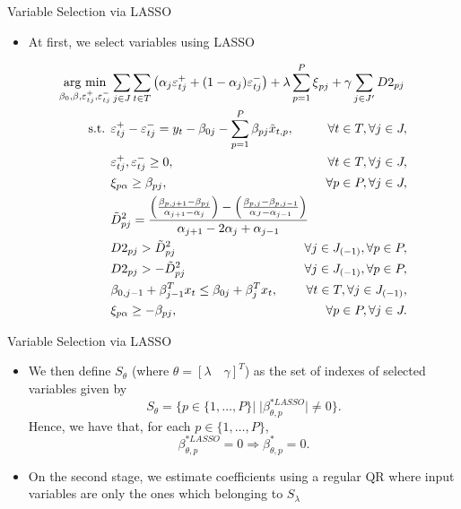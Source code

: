 \begin{frame}{Variable Selection via LASSO}

\begin{itemize}
\tightlist
\item
  At first, we select variables using LASSO
\end{itemize}

\tiny

\begin{eqnarray}
\underset{\beta_{0},\beta,\varepsilon_{t j}^{+},\varepsilon_{t j}^{-}}{\text{arg min}} & \sum_{j \in J} \sum_{t \in T}\left(\alpha_j \varepsilon_{t j}^{+}+(1-\alpha_j)\varepsilon_{t j}^{-}\right)+\lambda\sum_{p=1}^{P}\mbox{\ensuremath{\xi}}_{p j} + \gamma \sum_{j \in J'} D2_{pj} \span \label{eq:obj-lasso} \\
\mbox{s.t. } & \varepsilon_{t j}^{+}-\varepsilon_{t j}^{-}= y_{t}-\beta_{0 j}-\sum_{p=1}^{P}\beta_{p j}\tilde x_{t,p},&\forall t\in T, \forall j \in J, \\
& \varepsilon_{t j}^{+},\varepsilon_{t j}^{-}\geq0,&\forall t \in T, \forall j \in J,\\
& \xi_{p\alpha}\geq\beta_{p j},&\forall p\in P, \forall j \in J,  \label{l1-qar-3}
\\
& \tilde{D}_{pj}^{2}=\frac{\left(\frac{\beta_{p,j+1}-\beta_{pj}}{\alpha_{j+1}-\alpha_{j}}\right)-\left(\frac{\beta_{p,j}-\beta_{p,j-1}}{\alpha_{J}-\alpha_{j-1}}\right)}{\alpha_{j+1}-2\alpha_{j}+\alpha_{j-1}} \span\\
& D2_{pj} >  \tilde D_{pj}^{2} &  \forall j \in J_{(-1)}, \forall p\in P, \\
& D2_{pj} >  - \tilde D_{pj}^{2} &  \forall j \in J_{(-1)}, \forall p\in P,\\
& \beta_{0,j-1} + \beta_{j-1}^T x_{t} \leq \beta_{0j} + \beta_{j}^T x_{t}, & \forall t \in T, \forall j \in J_{(-1)},\\
& \xi_{p\alpha}\geq-\beta_{p j},&\forall p\in P, \forall j \in J. 
\end{eqnarray}

\end{frame}

\begin{frame}{Variable Selection via LASSO}

\begin{itemize}
\item
  We then define \(S_\theta\) (where
  \(\theta = [\lambda \quad \gamma]^T\)) as the set of indexes of
  selected variables given by \[
  S_{\theta} = \{ p \in \{ 1,\dots,P \} | \; |\beta^{*LASSO}_{\theta,p}| \neq 0  \}.
  \] Hence, we have that, for each \(p \in \{ 1,\dots,P \}\),
  \[\beta^{*LASSO}_{\theta,p} = 0 \Longrightarrow \beta^{*}_{\theta,p} = 0.\]
\item
  On the second stage, we estimate coefficients using a regular QR where
  input variables are only the ones which belonging to \(S_\lambda\)
\end{itemize}

\end{frame}

